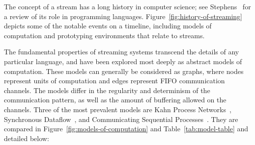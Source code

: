 The concept of a stream has a long history in computer science; see
Stephens~\cite{stephens_survey_1997} for a review of its role in
programming languages.  Figure~\ref{fig:history-of-streaming} depicts
some of the notable events on a timeline, including models of
computation and prototyping environments that relate to streams.

The fundamental properties of streaming systems transcend the details
of any particular language, and have been explored most deeply as
abstract models of computation.  These models can generally be
considered as graphs, where nodes represent units of computation and
edges represent FIFO communication channels.  The models differ in the
regularity and determinism of the communication pattern, as well as
the amount of buffering allowed on the channels.  Three of the most
prevalent models are Kahn Process Networks~\cite{kahn_semantics_1974},
Synchronous Dataflow~\cite{lee_static_1987}, and Communicating
Sequential Processes~\cite{hoare_communicating_1978}.  They are
compared in Figure~\ref{fig:models-of-computation} and
Table~\ref{tab:model-table} and detailed below:

